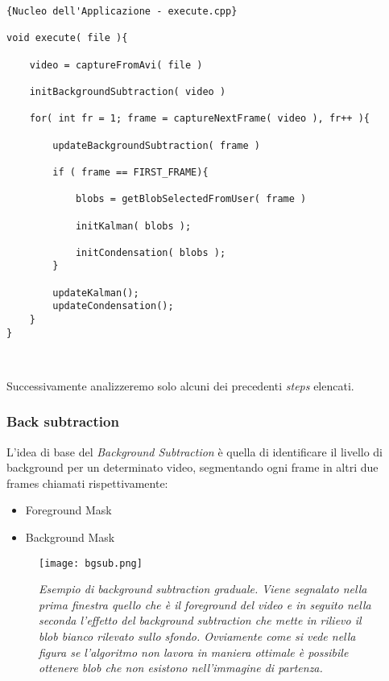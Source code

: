\lstset{language=c++}
\lstset{commentstyle=\emph}
\begin{lstlisting}[frame=r,caption=Nucleo dell'Applicazione - execute.cpp ,breaklines=true,basicstyle=\small]{Nucleo dell'Applicazione - execute.cpp}

void execute( file ){

	video = captureFromAvi( file )
	
	initBackgroundSubtraction( video )

	for( int fr = 1; frame = captureNextFrame( video ), fr++ ){
	
		updateBackgroundSubtraction( frame )
		
		if ( frame == FIRST_FRAME){
			
			blobs = getBlobSelectedFromUser( frame )
	
			initKalman( blobs );
			
			initCondensation( blobs );
		}
	
		updateKalman();
		updateCondensation();
	}
}



\end{lstlisting}

Successivamente analizzeremo solo alcuni dei precedenti \textit{steps} elencati.

\subsubsection{Back subtraction}
L'idea di base del \textit{Background Subtraction}  è quella di identificare il livello di background per un determinato video, segmentando ogni frame in altri due frames chiamati rispettivamente:

\begin{itemize}
\item Foreground Mask
\item Background Mask
\end{itemize}

\begin{figure}[hbp]
\centering
	\texttt{[image: bgsub.png]}
\caption[Esempio di background subtraction graduale]{\textit{Esempio di background subtraction graduale. Viene segnalato nella prima finestra quello che è il foreground del video e in seguito nella seconda l'effetto del background subtraction che mette in rilievo il blob bianco rilevato sullo sfondo. Ovviamente come si vede nella figura se l'algoritmo non lavora in maniera ottimale è possibile ottenere blob che non esistono nell'immagine di partenza.}\label{fig:bgsub}}
\end{figure}

